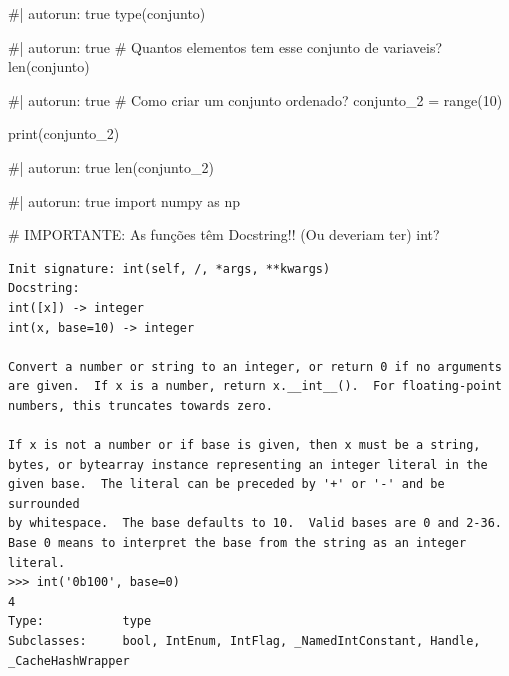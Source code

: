 \documentclass[
  letterpaper,
  DIV=11,
  numbers=noendperiod]{scrreprt}
\newenvironment{Shaded}{\begin{snugshade}}{\end{snugshade}}
\newcommand{\BuiltInTok}[1]{\textcolor[rgb]{0.00,0.23,0.31}{#1}}
\newcommand{\CommentTok}[1]{\textcolor[rgb]{0.37,0.37,0.37}{#1}}
\newcommand{\NormalTok}[1]{\textcolor[rgb]{0.00,0.23,0.31}{#1}}
\begin{document}
\begin{Shaded}
\begin{Highlighting}[]
\NormalTok{\#| autorun: true}
\NormalTok{type(conjunto)}
\end{Highlighting}
\end{Shaded}

\begin{Shaded}
\begin{Highlighting}[]
\NormalTok{\#| autorun: true}
\NormalTok{\# Quantos elementos tem esse conjunto de variaveis?}
\NormalTok{len(conjunto)}
\end{Highlighting}
\end{Shaded}

\begin{Shaded}
\begin{Highlighting}[]
\NormalTok{\#| autorun: true}
\NormalTok{\# Como criar um conjunto ordenado?}
\NormalTok{conjunto\_2 = range(10)}

\NormalTok{print(conjunto\_2)}
\end{Highlighting}
\end{Shaded}

\begin{Shaded}
\begin{Highlighting}[]
\NormalTok{\#| autorun: true}
\NormalTok{len(conjunto\_2)}
\end{Highlighting}
\end{Shaded}

\begin{Shaded}
\begin{Highlighting}[]
\NormalTok{\#| autorun: true}
\NormalTok{import numpy as np}
\end{Highlighting}
\end{Shaded}

\begin{Shaded}
\begin{Highlighting}[]
\CommentTok{\# IMPORTANTE: As funções têm Docstring!! (Ou deveriam ter)}
\BuiltInTok{int}\NormalTok{?}
\end{Highlighting}
\end{Shaded}

\begin{verbatim}
Init signature: int(self, /, *args, **kwargs)
Docstring:     
int([x]) -> integer
int(x, base=10) -> integer

Convert a number or string to an integer, or return 0 if no arguments
are given.  If x is a number, return x.__int__().  For floating-point
numbers, this truncates towards zero.

If x is not a number or if base is given, then x must be a string,
bytes, or bytearray instance representing an integer literal in the
given base.  The literal can be preceded by '+' or '-' and be surrounded
by whitespace.  The base defaults to 10.  Valid bases are 0 and 2-36.
Base 0 means to interpret the base from the string as an integer literal.
>>> int('0b100', base=0)
4
Type:           type
Subclasses:     bool, IntEnum, IntFlag, _NamedIntConstant, Handle, _CacheHashWrapper
\end{verbatim}
\end{document}
